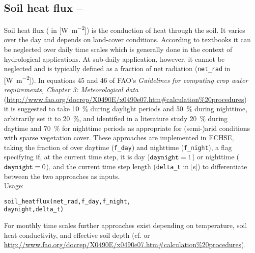 \subsection{Soil heat flux -- \heatfluxSoil} \label{sec:meteo:soilflux}
Soil heat flux (\heatfluxSoil{} in [\si{\watt\per\metre\squared}]) is the conduction of heat through the soil. It varies over the day and depends on land-cover conditions. According to textbooks it can be neglected over daily time scales which is generally done in the context of hydrological applications. At sub-daily application, however, it cannot be neglected and is typically defined as a fraction of net radiation \netRadiation{} (\verb!net_rad! in [\si{\watt\per\metre\squared}]). In equations 45 and 46 of FAO's \emph{Guidelines for computing crop water requirements, Chapter 3: Meteorological data} (\url{http://www.fao.org/docrep/X0490E/x0490e07.htm#calculation\%20procedures}) it is suggested to take \SI{10}{\percent} during daylight periods and \SI{50}{\percent} during nighttime, \citet{Shuttleworth1985} arbitrarily set it to \SI{20}{\percent}, and \citet{Guentner2002} identified in a literature study \SI{20}{\percent} during daytime and \SI{70}{\percent} for nighttime periods as appropriate for (semi-)arid conditions with sparse vegetation cover. These approaches are implemented in ECHSE, taking the fraction of \netRadiation{} over daytime (\verb!f_day!) and nighttime (\verb!f_night!), a flag specifying if, at the current time step, it is day ($\verb!daynight! = 1$) or nighttime ($\verb!daynight! = 0$), and the current time step length (\verb!delta_t! in [\si{\second}]) to differentiate between the two approaches as inputs.\\

\noindent
Usage:
\begin{verbatim}
soil_heatflux(net_rad,f_day,f_night,
daynight,delta_t)
\end{verbatim}

For monthly time scales further approaches exist depending on temperature, soil heat conductivity, and effective soil depth (cf. \citet{Maidment1993} or \url{http://www.fao.org/docrep/X0490E/x0490e07.htm#calculation\%20procedures}).
